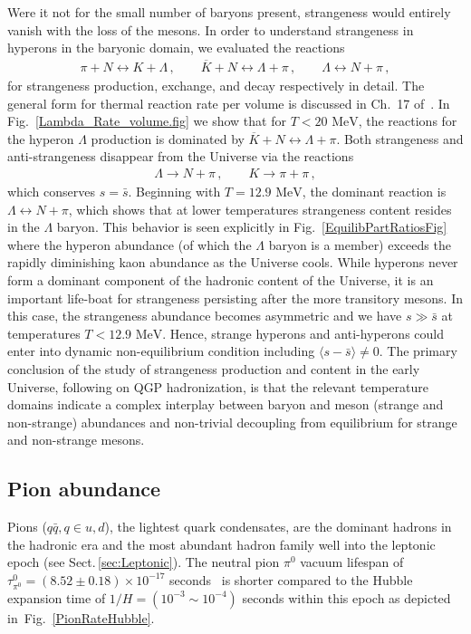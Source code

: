 \documentclass[universe,article,submit,moreauthors,pdftex,a4paper]{Definitions/mdpi}
\newcommand{\MeV}{\text{ MeV}}
\newcommand*{\rf}[1]{Fig.~{\ref{#1}}}
\newcommand*{\rsec}[1]{Sect.\,{\ref{#1}}}
\begin{document}
Were it not for the small number of baryons present, strangeness would entirely vanish with the loss of the mesons. In order to understand strangeness in hyperons in the baryonic domain, we evaluated the reactions 
\begin{align}
 \pi +N\leftrightarrow K+\Lambda\,,\qquad \overline{K}+N\leftrightarrow \Lambda+\pi\,,\qquad \Lambda\leftrightarrow N+\pi\,,
\end{align}
for strangeness production, exchange, and decay respectively in detail. The general form for thermal reaction rate per volume is discussed in Ch.~17 of~\cite{Letessier:2002ony}. In \rf{Lambda_Rate_volume.fig} we show that for $T<20\MeV$, the reactions for the hyperon $\Lambda$ production is dominated by $\overline{K}+N\leftrightarrow\Lambda+\pi$. Both strangeness and anti-strangeness disappear from the Universe via the reactions
\begin{align}
    \Lambda\rightarrow N+\pi\,,\qquad K\to\pi+\pi\,,
\end{align}
which conserves $s=\bar s$. Beginning with $T=12.9\MeV$, the dominant reaction is $\Lambda\leftrightarrow N+\pi$, which shows that at lower temperatures strangeness content resides in the $\Lambda$ baryon. This behavior is seen explicitly in \rf{EquilibPartRatiosFig} where the hyperon abundance (of which the $\Lambda$ baryon is a member) exceeds the rapidly diminishing kaon abundance as the Universe cools. While hyperons never form a dominant component of the hadronic content of the Universe, it is an important life-boat for strangeness persisting after the more transitory mesons. In this case, the strangeness abundance becomes asymmetric and we have $s\gg\bar{s}$ at temperatures $T<12.9\MeV$. Hence, strange hyperons and anti-hyperons could enter into dynamic non-equilibrium condition including $\langle s-\bar s\rangle \ne 0$. The primary conclusion of the study of strangeness production and content in the early Universe, following on QGP hadronization, is that the relevant temperature domains indicate a complex interplay between baryon and meson (strange and non-strange) abundances and non-trivial decoupling from equilibrium for strange and non-strange mesons.
\subsection{Pion abundance}\label{sec:Pions}
\noindent Pions ($q\bar q, q\in u,d$), the lightest quark condensates, are the dominant hadrons in the hadronic era and the most abundant hadron family well into the leptonic epoch (see \rsec{sec:Leptonic}). The neutral pion $\pi^0$ vacuum lifespan of $\tau_{\pi^0}^0=(8.52\pm0.18)\times10^{-17}$ seconds~\cite{ParticleDataGroup:2018ovx} is shorter compared to the Hubble expansion time of $1/H=(10^{-3}\sim10^{-4})$ seconds within this epoch as depicted in~\rf{PionRateHubble}.
\end{document}
